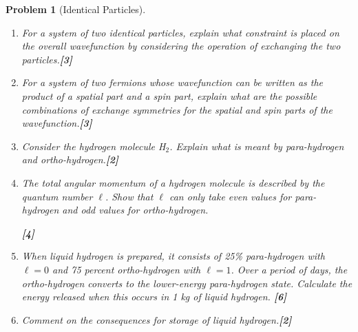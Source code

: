 \documentclass[a4paper]{article}
\theoremstyle{new}
\newtheorem{qns}{Problem}[subsection]
\begin{document}
\newpage
\begin{qns}[Identical Particles]\leavevmode
\begin{enumerate}[label=(\roman*)]
\item For a system of two identical particles, explain what constraint is placed on the overall wavefunction by considering the operation of exchanging the two particles.\hfill\textbf{[3]}
\item For a system of two fermions whose wavefunction can be written as the product of a spatial part and a spin part, explain what are the possible combinations of exchange symmetries for the spatial and spin parts of the wavefunction.\hfill\textbf{[3]}
\item Consider the hydrogen molecule H$_2$. Explain what is meant by para-hydrogen and ortho-hydrogen.\hfill\textbf{[2]}
\item The total angular momentum of a hydrogen molecule is described by the quantum number $\ell$. Show that $\ell$ can only take even values for para-hydrogen and odd values for ortho-hydrogen.

\hfill\textbf{[4]}
\begin{mdframed}
\end{mdframed}
\item When liquid hydrogen is prepared, it consists of 25\% para-hydrogen with $\ell=0$ and 75 percent ortho-hydrogen with $\ell = 1$. Over a period of days, the ortho-hydrogen converts to the lower-energy para-hydrogen state. Calculate the energy released when this occurs in 1 kg of liquid hydrogen. \hfill\textbf{[6]}

\begin{mdframed}
\color{darkblue}{The bond length in the hydrogen molecule is 74 pm.}
\end{mdframed}
\item Comment on the consequences for storage of liquid hydrogen.\hfill\textbf{[2]}
\end{enumerate}
\end{qns}
\end{document}
